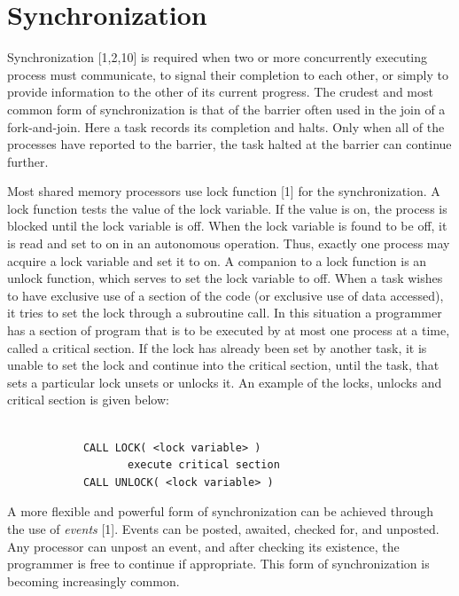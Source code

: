 \section{Synchronization}
Synchronization [1,2,10] is required when two or more concurrently executing process must communicate, to signal their completion to each other, or simply to
provide information to the other of its current progress. The crudest and most common form of synchronization is that of the barrier often used in the join of
a fork-and-join. Here a task records its completion and halts. Only when all of the processes have reported to the barrier, the task halted at the barrier
can continue further.\par
\hspace{1in} Most shared memory processors use lock function [1] for the synchronization. A lock function tests the value of the lock variable. If the value is
on, the process is blocked until the lock variable is off. When the lock variable is found to be off, it is read and set to on in an autonomous operation.
Thus, exactly one process may acquire a lock variable and set it to on. A companion to a lock function is an unlock function, which serves to set the lock
variable to off. When a task wishes to have exclusive use of a section of the code (or exclusive use of data accessed), it tries to set the lock through a
subroutine call. In this situation a programmer has a section of program that is to be executed by at most one process at a time, called a critical section. If
the lock has already been set by another task, it is unable to set the lock and continue into the critical section, until the task, that sets a particular lock
unsets or unlocks it. An example of the locks, unlocks and critical section is given below:

\begin{verbatim}

            CALL LOCK( <lock variable> )
                   execute critical section
            CALL UNLOCK( <lock variable> )

\end{verbatim}
A more flexible and powerful form of synchronization can be achieved through the use of {\it events} [1]. Events can be posted, awaited, checked for, and
unposted. Any processor can unpost an event, and after checking its existence, the programmer is free to continue if appropriate. This form of synchronization
is becoming increasingly common.

